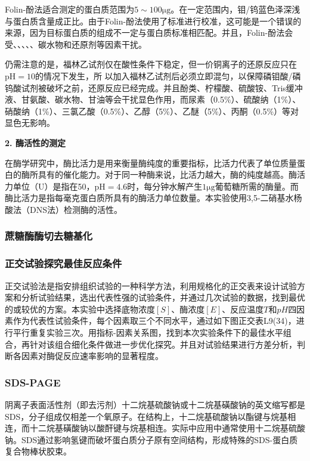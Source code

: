 Folin-酚法适合测定的蛋白质范围为$5\sim100 \mathrm{μg}$。在一定范围内，钼/钨蓝色泽深浅与蛋白质含量成正比。由于Folin-酚法使用了标准进行校准，这可能是一个错误的来源，因为目标蛋白质的组成不一定与蛋白质标准相匹配。并且，Folin-酚法会受、、、、、碳水物和还原剂等因素干扰。

仍需注意的是，福林乙试剂仅在酸性条件下稳定，但一价铜离子的还原反应只在$\mathrm{pH}=10$的情况下发生，所
以加入福林乙试剂后必须立即混匀，以保障磷钼酸/磷钨酸试剂被破坏之前，还原反应已经完成。并且酚类、柠檬酸、硫酸铵、Tris缓冲液、甘氨酸、碳水物、甘油等会干扰显色作用，而尿素（0.5\%）、硫酸纳（1\%）、硝酸纳（1\%）、三氯乙酸（0.5\%）、乙醇（5\%）、乙醚（5\%）、丙酮（0.5\%）等对显色无影响。

 \noindent \textbf {2. 酶活性的测定}
 
在酶学研究中，酶比活力是用来衡量酶纯度的重要指标，比活力代表了单位质量蛋白的酶所具有的催化能力。对于同一种酶来说，比活力越大，酶的纯度越高。酶活力单位（U）是指在50\dc，$\mathrm{pH}=4.6$时，每分钟水解产生$1\mathrm{μg}$葡萄糖所需的酶量。而酶比活力是指每毫克蛋白质所具有的酶活力单位数量。本实验使用3,5-二硝基水杨酸法（DNS法）检测酶的活性。

\subsubsection{蔗糖酶酶切去糖基化}

\subsubsection{正交试验探究最佳反应条件}
\par 正交试验法是指安排组织试验的一种科学方法，利用规格化的正交表来设计试验方案和分析试验结果，选出代表性强的试验条件，并通过几次试验的数据，找到最优的或较优的方案。本实验中选择底物浓度$[S]$、酶浓度$[E]$、反应温度$T$和$pH$四因素作为代表性试验条件，每个因素取三个不同水平，通过如下图正交表L9(34)，进行平行重复实验三次。用指标-因素关系图，找到本次实验条件下的最佳水平组合，再针对该组合细化条件做进一步优化探究。并且对试验结果进行方差分析，判断各因素对酶促反应速率影响的显著程度。
\subsubsection{SDS-PAGE}
阴离子表面活性剂（即去污剂）十二烷基硫酸钠或十二烷基磺酸钠的英文缩写都是SDS，分子组成仅相差一个氧原子。在结构上，十二烷基硫酸钠以酯键与烷基相连，而十二烷基磺酸钠以酸酐键与烷基相连。实际中应用中通常使用十二烷基硫酸钠。SDS通过影响氢键而破坏蛋白质分子原有空间结构，形成特殊的SDS-蛋白质复合物棒状胶束。


